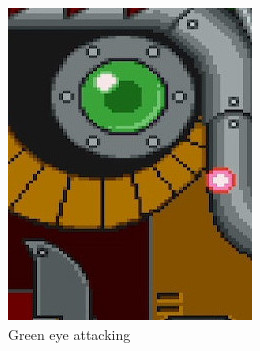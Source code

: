 \begin{figure}[htp]
	\centering
	\begin{subfigure}[t]{0.30\linewidth}
		\centering
		\includegraphics[width=\linewidth]{figures/X1/Sigma_stages/Rangda_green.jpg}
		\caption{Green eye attacking}
	\end{subfigure}
	\begin{subfigure}[t]{0.30\linewidth}
		\centering

\end{subfigure}
\end{figure}
